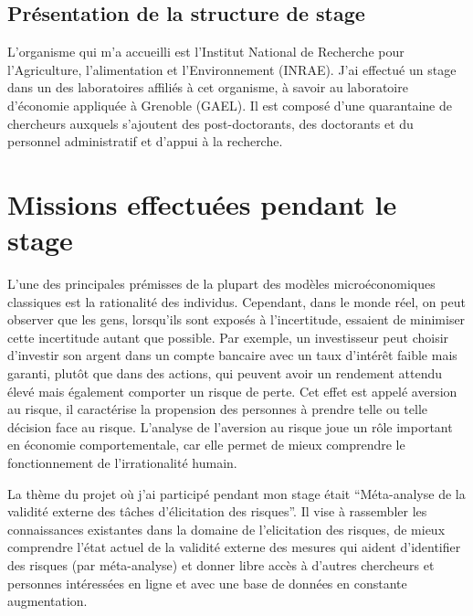 \documentclass[12pt]{article}
\begin{document}
\subsection{Présentation de la structure de stage}

L'organisme qui m'a accueilli est l'Institut National de Recherche pour
l'Agriculture, l'alimentation et l'Environnement (INRAE). J'ai effectué
un stage dans un des laboratoires affiliés à cet organisme, à savoir au
laboratoire d'économie appliquée à Grenoble (GAEL). Il est composé d'une
quarantaine de chercheurs auxquels s'ajoutent des post-doctorants, des
doctorants et du personnel administratif et d'appui à la recherche.

\section{Missions effectuées pendant le stage}
\label{sec:third}

L'une des principales prémisses de la plupart des modèles
microéconomiques classiques est la rationalité des individus. Cependant,
dans le monde réel, on peut observer que les gens, lorsqu'ils sont
exposés à l'incertitude, essaient de minimiser cette incertitude autant
que possible. Par exemple, un investisseur peut choisir d'investir son
argent dans un compte bancaire avec un taux d'intérêt faible mais
garanti, plutôt que dans des actions, qui peuvent avoir un rendement
attendu élevé mais également comporter un risque de perte. Cet effet est
appelé aversion au risque, il caractérise la propension des personnes à
prendre telle ou telle décision face au risque. L'analyse de l'aversion
au risque joue un rôle important en économie comportementale, car elle
permet de mieux comprendre le fonctionnement de l'irrationalité humain.

La thème du projet où j'ai participé pendant mon stage était
``Méta-analyse de la validité externe des tâches d'élicitation des
risques''. Il vise à rassembler les connaissances existantes dans la
domaine de l'elicitation des risques, de mieux comprendre l'état actuel
de la validité externe des mesures qui aident d'identifier des risques
(par méta-analyse) et donner libre accès à d'autres chercheurs et
personnes intéressées en ligne et avec une base de données en constante
augmentation.
\end{document}
